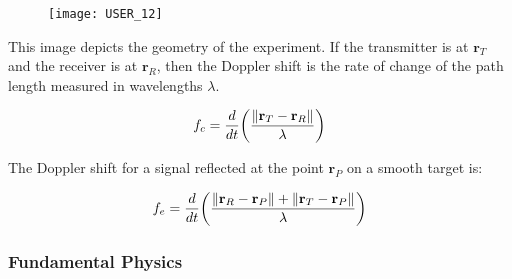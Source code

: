 \documentclass{article}
\begin{document}
            \begin{wrapfigure}{l}{0.58\textwidth}
            	\begin{center}
            	\texttt{[image: USER\_12]}
            	\end{center}
            \end{wrapfigure}
            \noindent This image depicts the geometry of the experiment. If the transmitter is at $\mathbf{r}_{T}$ and the receiver is at $\mathbf{r}_{R}$, then the Doppler shift is the rate of change of the path length measured in wavelengths $\lambda$. 
            
            \begin{equation}
            f_{c} = \frac{d}{dt}\bigg(\frac{\lVert\mathbf{r}_{T}-\mathbf{r}_{R}\rVert}{\lambda}\bigg)
            \end{equation}
            
            \noindent The Doppler shift for a signal reflected at the point $\mathbf{r}_{P}$ on a smooth target is:
            
            \begin{equation}
            f_{e} = \frac{d}{dt}\bigg(\frac{\lVert\mathbf{r}_{R} - \mathbf{r}_{P}\rVert+\lVert\mathbf{r}_{T}-\mathbf{r}_{P}\rVert}{\lambda}\bigg)
            \end{equation}
            
            \subsubsection{Fundamental Physics}
            
\end{document}
